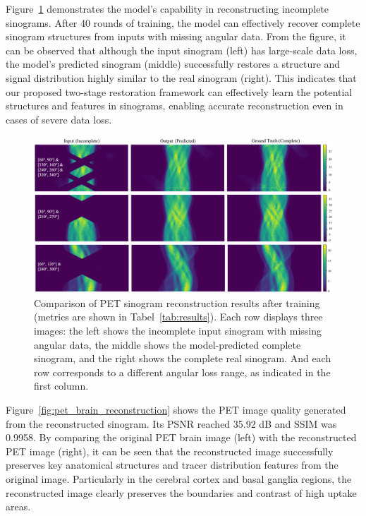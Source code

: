 \documentclass[aps,prb,preprint,groupedaddress,showkeys]{revtex4}
\begin{document}
Figure~\ref{fig:pet_reconstruction_results} demonstrates the model's capability in reconstructing incomplete sinograms. After 40 rounds of training, the model can effectively recover complete sinogram structures from inputs with missing angular data. From the figure, it can be observed that although the input sinogram (left) has large-scale data loss, the model's predicted sinogram (middle) successfully restores a structure and signal distribution highly similar to the real sinogram (right). This indicates that our proposed two-stage restoration framework can effectively learn the potential structures and features in sinograms, enabling accurate reconstruction even in cases of severe data loss.
\begin{figure}[ht]
    \centering
    \includegraphics[width=\textwidth]{Images/sinograms.pdf}
    \vspace{-1cm}
    \caption{Comparison of PET sinogram reconstruction results after training (metrics are shown in Tabel~\ref{tab:results}). Each row displays three images: the left shows the incomplete input sinogram with missing angular data, the middle shows the model-predicted complete sinogram, and the right shows the complete real sinogram. And each row corresponds to a different angular loss range, as indicated in the first column. }
    \label{fig:pet_reconstruction_results}
\end{figure}
Figure~\ref{fig:pet_brain_reconstruction} shows the PET image quality generated from the reconstructed sinogram. Its PSNR reached 35.92 dB and SSIM was 0.9958. By comparing the original PET brain image (left) with the reconstructed PET image (right), it can be seen that the reconstructed image successfully preserves key anatomical structures and tracer distribution features from the original image. Particularly in the cerebral cortex and basal ganglia regions, the reconstructed image clearly preserves the boundaries and contrast of high uptake areas. 
\end{document}

